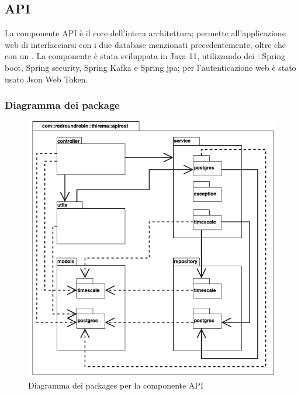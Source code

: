 \subsection{API}
	La componente API è il core dell'intera architettura; permette all'applicazione web di interfacciarsi con i due database menzionati precedentemente, oltre che con un .
	\newline
	La componente è stata sviluppata in Java 11, utilizzando dei : Spring boot, Spring security, Spring Kafka e Spring jpa; per l'autenticazione web è stato usato Json Web Token.

	\subsubsection{Diagramma dei package}%
		\begin{figure}[H]
			\centering
			\includegraphics[scale=0.500]{res/images/API/packageAPI.png}
			\caption{Diagramma dei packages per la componente API}
			\label{Diagramma 10}
		\end{figure}

